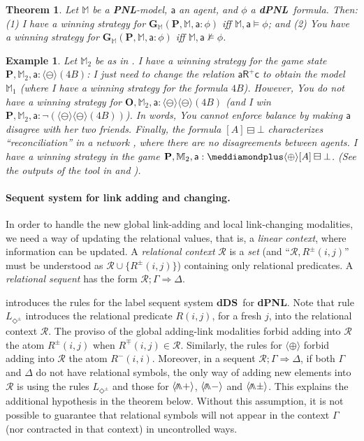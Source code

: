 \documentclass{easychair}
\newcommand{\I}{\emph{I}\xspace}
\newcommand{\You}{\emph{You}\xspace}
\newcommand{\dDS}{\mathbf{dDS}}
\newcommand{\seq}{\Rightarrow}
\newcommand{\rs}[3]{#1;#2\seq #3}
\newcommand{\rc}{\mathcal{R}}
\newcommand{\M}{\mathbb{M}}
\newcommand{\R}{\mathsf{R}}
\newcommand{\ag}{\mathsf{a}}
\renewcommand{\c}{\mathsf{c}}
\newtheorem{example}{Example}
\newtheorem{theorem}{Theorem}
\newcommand{\pnlP}{\langle \bigdoublewedge+ \rangle }
\newcommand{\pnlN}{\langle\bigdoublewedge-\rangle}
\newcommand{\pnlPN}{\langle\bigdoublewedge\pm\rangle}
\newcommand{\pnlOP}{\langle\oplus\rangle}
\newcommand{\pnlON}{\langle\ominus\rangle}
\newcommand{\dplus}{\meddiamondplus}
\newcommand{\bminus}{\boxminus}
\DeclareMathOperator*{\bigdoublewedge}{\wedge\mkern-15mu\wedge}
\newcommand{\bbM}{\mathbb{M}}
\newcommand{\bfP}{\mathbf{P}}
\newcommand{\bfO}{\mathbf{O}}
\newcommand{\PNL}{\textbf{PNL}}
\newcommand{\dPNL}{\textbf{dPNL}}
\begin{document}
\begin{theorem}\label{th:adequacy2}
Let $\M$ be a \PNL-model, $\ag$ an agent, and $\phi$ a \dPNL~formula.
Then: (1)
 \I have a winning strategy for $\mathbf{G}_\M(\mathbf{P}, \M, \ag: \phi)$ iff $\M,\ag \models \phi$; and (2)
 \You have a winning strategy for $\mathbf{G}_{\M}(\mathbf{P}, \M, \ag: \phi)$ iff $\M,\ag\not \models \phi$.
\end{theorem}
\begin{example}\label{ex:consensus}
    Let $\M_2$ be as in . 
    \I have a winning strategy for the game state $\bfP,\bbM_2,\ag : \pnlON (4B)$:
    \I just need to change the relation  $\ag \R^+ \c$ to obtain 
    the model $\M_1$ (where \I have a winning strategy for the formula $4B$). 
    However, \You do not have a winning strategy for $\bfO,\bbM_2,\ag : \pnlON \pnlON (4B)$
    (and \I win $\bfP,\bbM_2,\ag : \neg(\pnlON \pnlON (4B))$). In words, 
    \You cannot enforce \emph{balance} by making $\ag$ disagree with her two friends. 
    Finally, the formula $[A]\bminus \bot$ characterizes ``reconciliation'' in a network \cite{DBLP:journals/logcom/PedersenSA21}, 
    where there are no disagreements between agents. \I have a winning strategy in the game 
    $\bfP, \bbM_2,\ag : \dplus \pnlOP [A] \bminus\bot$. (See the outputs of the tool in   and \cite{tool}). 
\end{example}



 

\paragraph{Sequent system for  link adding and changing.}
\label{sec:extended_sequents}

 In order to handle the new global link-adding and local link-changing modalities, we need a way of
updating the relational values, that is, a {\em linear context}, where
information can be updated. 
A {\em relational context} $\mathcal{R}$ is a \emph{set} (and ``$\mathcal{R}, R^\pm(i,j)$'' must be 
understood as $\mathcal{R} \cup \{R^\pm(i,j)\}$) containing only relational predicates. A {\em relational sequent} has the form
$
\rs{\rc}{\Gamma}{\Delta}
$. 

 introduces the rules for the label sequent system $\dDS$~for
\dPNL. Note that rule $L_{\Diamond^\pm}$ introduces the relational predicate
$R(i,j)$, for a fresh $j$, into the relational context $\mathcal{R}$. The
proviso of the global adding-link modalities forbid adding into $\mathcal{R}$
the atom  $R^\pm(i,j)$ when  $R^\mp(i,j)\in \mathcal{R}$. Similarly, the rules
for $\pnlOP$ forbid adding into $\mathcal{R}$ the atom $R^-(i,i)$. Moreover, in
a sequent $\mathcal{R} ; \Gamma \Rightarrow \Delta$, if both $\Gamma$ and
$\Delta$ do not have relational symbols, the only way of adding new elements
into $\mathcal{R}$ is using the rules $L_{\Diamond^\pm}$ and those for $\pnlP$,
$\pnlN$ and $\pnlPN$. This explains the additional hypothesis in the theorem
below. Without this assumption, it is not possible to guarantee that relational
symbols will not appear in the context $\Gamma$ (nor contracted in that
context) in uncontrolled ways. 
\end{document}
